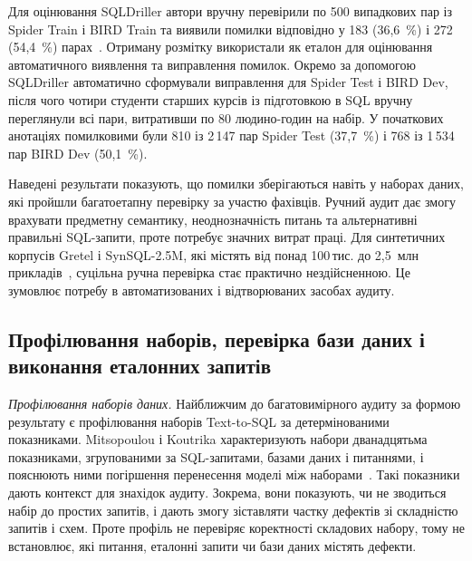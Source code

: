 \documentclass[a4paper,14pt,oneside]{extreport}
\begin{document}
Для оцінювання SQLDriller автори вручну перевірили по 500 випадкових пар із Spider Train і BIRD Train та виявили помилки відповідно у 183 (36,6~\%) і 272 (54,4~\%) парах~\cite{yang2025sqldriller}. Отриману розмітку використали як еталон для оцінювання автоматичного виявлення та виправлення помилок. Окремо за допомогою SQLDriller автоматично сформували виправлення для Spider Test і BIRD Dev, після чого чотири студенти старших курсів із підготовкою в SQL вручну переглянули всі пари, витративши по 80 людино-годин на набір. У початкових анотаціях помилковими були 810 із 2\,147 пар Spider Test (37,7~\%) і 768 із 1\,534 пар BIRD Dev (50,1~\%).

Наведені результати показують, що помилки зберігаються навіть у наборах даних, які пройшли багатоетапну перевірку за участю фахівців. Ручний аудит дає змогу врахувати предметну семантику, неоднозначність питань та альтернативні правильні SQL-запити, проте потребує значних витрат праці. Для синтетичних корпусів Gretel і SynSQL-2.5M, які містять від понад 100\,тис. до 2,5~млн прикладів~\cite{gretel2024synth,li2025omnisql}, суцільна ручна перевірка стає практично нездійсненною. Це зумовлює потребу в автоматизованих і відтворюваних засобах аудиту.

\subsection{Профілювання наборів, перевірка бази даних і виконання еталонних запитів}
\label{subsec:rule-based-audit}

\textit{Профілювання наборів даних.}
Найближчим до багатовимірного аудиту за формою результату є профілювання наборів Text-to-SQL за детермінованими показниками. Mitsopoulou і Koutrika характеризують набори дванадцятьма показниками, згрупованими за SQL-запитами, базами даних і питаннями, і пояснюють ними погіршення перенесення моделі між наборами~\cite{mitsopoulou2025analysis}. Такі показники дають контекст для знахідок аудиту. Зокрема, вони показують, чи не зводиться набір до простих запитів, і дають змогу зіставляти частку дефектів зі складністю запитів і схем. Проте профіль не перевіряє коректності складових набору, тому не встановлює, які питання, еталонні запити чи бази даних містять дефекти.
\end{document}
